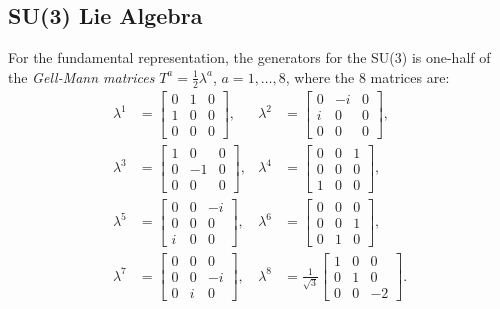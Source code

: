 \subsection{SU(3) Lie Algebra}
For the fundamental representation, the generators for the SU(3) is one-half of the \textit{Gell-Mann matrices} $T^a = \frac{1}{2}\lambda^a$, $a=1,\dots,8$, where the 8 matrices are:
\begin{equation}
\begin{aligned}
	\lambda^1 &= \left[\begin{array}{ccc}
		0 & 1 & 0 \\ 1 & 0 & 0 \\ 0 & 0 & 0
	\end{array} \right], &
	\lambda^2 &= \left[\begin{array}{ccc}
		0 & -i & 0 \\ i & 0 & 0 \\ 0 & 0 & 0
	\end{array} \right], \\
	\lambda^3 &= \left[\begin{array}{ccc}
		1 & 0 & 0 \\ 0 & -1 & 0 \\ 0 & 0 & 0
	\end{array} \right], &
	\lambda^4 &= \left[\begin{array}{ccc}
		0 & 0 & 1 \\ 0 & 0 & 0 \\ 1 & 0 & 0
	\end{array} \right], \\
	\lambda^5 &= \left[\begin{array}{ccc}
		0 & 0 & -i \\ 0 & 0 & 0 \\ i & 0 & 0
	\end{array} \right], &
	\lambda^6 &= \left[\begin{array}{ccc}
		0 & 0 & 0 \\ 0 & 0 & 1 \\ 0 & 1 & 0
	\end{array} \right], \\
	\lambda^7 &= \left[\begin{array}{ccc}
		0 & 0 & 0 \\ 0 & 0 & -i \\ 0 & i & 0
	\end{array} \right], &
	\lambda^8 &= \frac{1}{\sqrt{3}}\left[\begin{array}{ccc}
		1 & 0 & 0 \\ 0 & 1 & 0 \\ 0 & 0 & -2
	\end{array} \right].
\end{aligned}
\end{equation}
